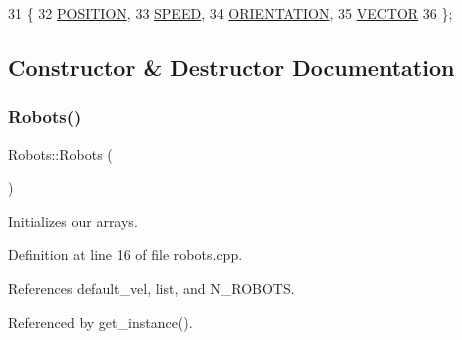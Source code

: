 \begin{DoxyCode}
31               \{
32         \hyperlink{class_robots_adcc7ae7fbb9bdc57a26ee70fa1ae88e5a6beca7349672ec17b6a0a7b04f4f1615}{POSITION},
33         \hyperlink{class_robots_adcc7ae7fbb9bdc57a26ee70fa1ae88e5a834a07faebe2dff9d8d12e2aa9ec5a09}{SPEED},
34         \hyperlink{class_robots_adcc7ae7fbb9bdc57a26ee70fa1ae88e5a4062dd5b3d7d62bbdb60c47a678d0430}{ORIENTATION},
35         \hyperlink{class_robots_adcc7ae7fbb9bdc57a26ee70fa1ae88e5ae8464c5548b456a68b657528ede6cd40}{VECTOR}
36     \};
\end{DoxyCode}


\subsection{Constructor \& Destructor Documentation}
\mbox{\label{class_robots_aa2745a48ebd3e52b9a3020f6afbcb25d}} 
\subsubsection{\texorpdfstring{Robots()}{Robots()}}
{\footnotesize\ttfamily Robots\+::\+Robots (\begin{DoxyParamCaption}{ }\end{DoxyParamCaption})\hspace{0.3cm}{\ttfamily [private]}}



Initializes our arrays. 



Definition at line 16 of file robots.\+cpp.



References default\+\_\+vel, list, and N\+\_\+\+R\+O\+B\+O\+TS.



Referenced by get\+\_\+instance().


